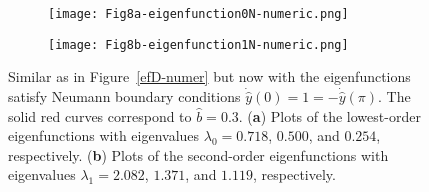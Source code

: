 \documentclass[symmetry,article,accept,moreauthors,pdftex,a4paper]{mdpi}
\begin{document}
\nointerlineskip
\begin{figure}[H]
\widefigure
\begin{subfigure}{0.45\textwidth}
\caption{} \vspace{0.1cm}
\texttt{[image: Fig8a-eigenfunction0N-numeric.png]}
\end{subfigure}	\hspace*{0.5cm}
\begin{subfigure}{0.45\textwidth}
\caption{} \vspace{0.1cm}
\texttt{[image: Fig8b-eigenfunction1N-numeric.png]}
\end{subfigure}
\caption{Similar as in Figure~\ref{efD-numer} but now with the eigenfunctions satisfy Neumann boundary conditions $\dot{\widehat{y}}(0) = 1 = -\dot{\widehat{y}}(\pi)$. The solid red curves correspond to $\widehat{b} = 0.3$. (\textbf{a}) Plots of the lowest-order eigenfunctions with eigenvalues $\lambda_0 = 0.718$, $0.500$, and $0.254$, respectively. (\textbf{b}) Plots of the second-order eigenfunctions with eigenvalues $\lambda_1 = 2.082$, $1.371$, and $1.119$, respectively.}		\label{efN-numer}
\end{figure}
\end{document}
